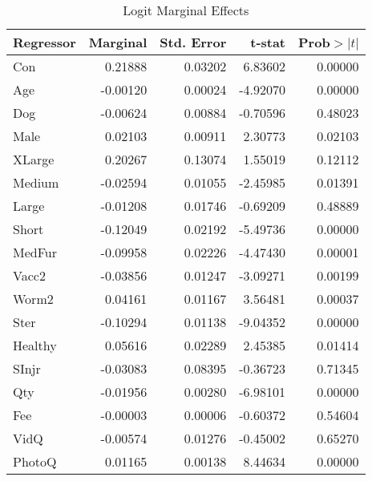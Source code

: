 \documentclass[12pt]{article}
\begin{document}
	\begin{table}[h]
		\centering
		\caption{Logit Marginal Effects}
		\begin{tabular}{@{}lrrrr@{}}
			\toprule
			Regressor & Marginal & Std. Error & t-stat   & Prob$ >|t| $ \\ \midrule
			Con       & 0.21888  & 0.03202    & 6.83602  & 0.00000  \\
			Age       & -0.00120 & 0.00024    & -4.92070 & 0.00000  \\
			Dog       & -0.00624 & 0.00884    & -0.70596 & 0.48023  \\
			Male      & 0.02103  & 0.00911    & 2.30773  & 0.02103  \\
			XLarge    & 0.20267  & 0.13074    & 1.55019  & 0.12112  \\
			Medium    & -0.02594 & 0.01055    & -2.45985 & 0.01391  \\
			Large     & -0.01208 & 0.01746    & -0.69209 & 0.48889  \\
			Short     & -0.12049 & 0.02192    & -5.49736 & 0.00000  \\
			MedFur    & -0.09958 & 0.02226    & -4.47430 & 0.00001  \\
			Vacc2     & -0.03856 & 0.01247    & -3.09271 & 0.00199  \\
			Worm2     & 0.04161  & 0.01167    & 3.56481  & 0.00037  \\
			Ster      & -0.10294 & 0.01138    & -9.04352 & 0.00000  \\
			Healthy   & 0.05616  & 0.02289    & 2.45385  & 0.01414  \\
			SInjr     & -0.03083 & 0.08395    & -0.36723 & 0.71345  \\
			Qty       & -0.01956 & 0.00280    & -6.98101 & 0.00000  \\
			Fee       & -0.00003 & 0.00006    & -0.60372 & 0.54604  \\
			VidQ      & -0.00574 & 0.01276    & -0.45002 & 0.65270  \\
			PhotoQ    & 0.01165  & 0.00138    & 8.44634  & 0.00000  \\ \bottomrule
		\end{tabular}
		\label{table:5}
	\end{table}
\end{document}
